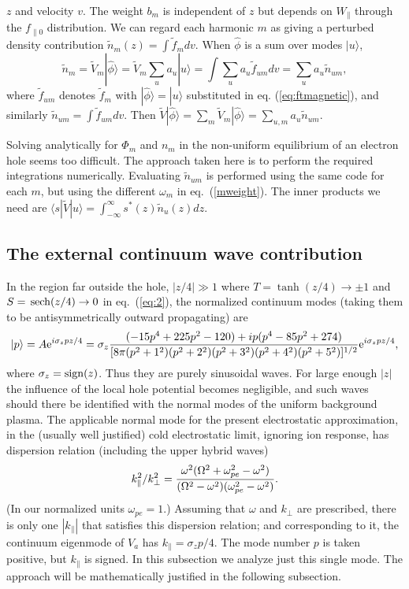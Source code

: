 \documentclass[12pt]{article}
\def\ket#1{|#1\rangle}
\def\bra#1{\langle#1}
\def\sech{{\,\rm sech}}
\def\etothe#1{{\rm e}^{#1}}
\begin{document}
$z$ and velocity $v$. The weight $b_m$ is independent of $z$ but
depends on $W_\parallel$ through the $f_{\parallel0}$ distribution.  We can
regard each harmonic $m$ as giving a perturbed density contribution
$\tilde n_m(z)=\int \tilde f_m dv$. When $\hat\phi$ is a sum over
modes $\ket{u}$,
\begin{equation}
  \label{eq:13}
\tilde  n_m=\tilde{V}_{m}\ket{\hat\phi}=\tilde{V}_{m}\sum_u a_u\ket{u}=\int \sum_u a_u
  \tilde f_{um} dv=\sum_u a_u \tilde n_{um},
\end{equation}
where $\tilde f_{um}$ denotes $\tilde f_m$ with
$\ket{\hat\phi}=\ket{u}$ substituted in eq. (\ref{eq:ftmagnetic}), and
similarly $\tilde n_{um}=\int \tilde f_{um}dv$. Then
$\tilde V \ket{\hat\phi}=\sum_m\tilde
V_m\ket{\hat\phi}=\sum_{u,m}a_u\tilde n_{um}$.

Solving analytically for $\Phi_m$ and $n_m$ in the non-uniform
equilibrium of an electron hole seems too difficult. The approach
taken here is to perform the required integrations numerically.
 Evaluating $\tilde
n_{um}$ is performed using the same code for each $m$, but using the
different $\omega_m$ in eq.\ (\ref{mweight}). The inner products
we need are $\bra{s}|\tilde V\ket{u}=\int_{-\infty}^\infty s^*(z)\tilde
n_{u}(z) dz$.

\subsection{The external continuum wave contribution}

In the region far outside the hole, $|z/4|\gg 1$ where
$T=\tanh(z/4)\to\pm1$ and $S=\sech(z/4)\to0$ in eq.\ (\ref{eq:2}), the
normalized continuum modes (taking them to be antisymmetrically
outward propagating) are
\begin{equation}
  \label{eq:14}
 \ket{p}=A\etothe{i\sigma_zpz/4}=\sigma_z{(-15p^4+225p^2-120) +ip (p^{4}-85p^{2}+274)\over
      [8\pi(p^2+1^2)(p^2+2^2)(p^2+3^2)(p^2+4^2)(p^2+5^2)]^{1/2}}\etothe{i\sigma_zpz/4},
\end{equation}
where $\sigma_z={\rm sign}(z)$. Thus they are purely sinusoidal
waves. For large enough $|z|$ the influence of the local hole
potential becomes negligible, and such waves should there be
identified with the normal modes of the uniform background plasma.
The applicable normal mode for the present electrostatic
approximation, in the (usually well justified) cold electrostatic limit,
ignoring ion response, has dispersion relation (including the upper
hybrid waves)
\begin{equation}
  \label{eq:15}
  k_\parallel^2/k_\perp^2={\omega^2(\Omega^2+\omega_{pe}^2-\omega^2)
    \over(\Omega^2-\omega^2)(\omega_{pe}^2-\omega^2)}.
\end{equation}
(In our normalized units $\omega_{pe}=1$.)  Assuming that $\omega$ and
$k_\perp$ are prescribed, there is only one $|k_\parallel|$ that
satisfies this dispersion relation; and corresponding to it, the
continuum eigenmode of $V_a$ has $k_\parallel=\sigma_zp/4$. The mode
number $p$ is taken positive, but $k_\parallel$ is signed. In this
subsection we analyze just this single mode. The approach will be
mathematically justified in the following subsection.
\end{document}
